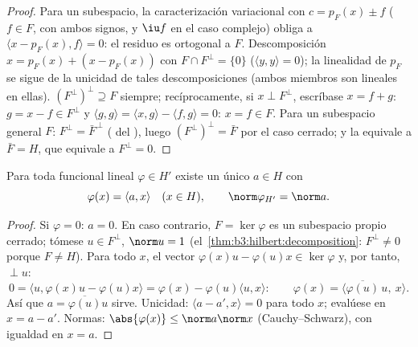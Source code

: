 \begin{proof}
Para un subespacio, la caracterización variacional con $c =
p_F(x) \pm f$ ($f \in F$, con ambos signos, y $\iu f$ en el caso
complejo) obliga a $\langle x - p_F(x), f\rangle = 0$: el residuo es
ortogonal a $F$. Descomposición $x = p_F(x) + (x
- p_F(x))$ con $F \cap F^\perp = \{0\}$ ($\langle y, y
\rangle = 0$); la linealidad de $p_F$ se sigue de la unicidad de tales
descomposiciones (ambos miembros son lineales en ellas). $(F^\perp)
^\perp \supseteq F$ siempre; recíprocamente, si $x \perp F^\perp$,
escríbase $x = f + g$: $g = x - f \in F^\perp$ y $\langle g,
g\rangle = \langle x, g\rangle - \langle f, g\rangle = 0$: $x
= f \in F$. Para un subespacio general $F$: $F^\perp = \bar
F^{\,\perp}$ ( del
), luego
$(F^\perp)^\perp = \bar F$ por el caso cerrado; y la
 equivale a $\bar F = H$, que
equivale a $F^\perp = 0$.
\end{proof}

\begin{theorem}\label{thm:b3:hilbert:riesz}
Para toda funcional lineal 
$\varphi \in H'$ existe un único $a \in H$ con
\[
\varphi(x) = \langle a, x\rangle \quad (x \in H),
\qquad \norm\varphi_{H'} = \norm a .
\]
\end{theorem}

\begin{proof}
Si $\varphi = 0$: $a = 0$. En caso contrario, $F = \ker\varphi$ es un
subespacio propio cerrado; tómese $u \in F^\perp$, $\norm u = 1$
(el~\cref{thm:b3:hilbert:decomposition}: $F^\perp \neq 0$ porque
$F \neq H$). Para todo $x$, el vector $\varphi(x)u -
\varphi(u)x \in \ker\varphi$ y, por tanto, $\perp u$:
\[
0 = \langle u, \varphi(x)u - \varphi(u)x\rangle
= \varphi(x) - \varphi(u)\langle u, x\rangle :
\qquad \varphi(x) = \langle
\overline{\varphi(u)}\,u,\ x\rangle .
\]
Así que $a = \overline{\varphi(u)}u$ sirve. Unicidad: $\langle a
- a', x\rangle = 0$ para todo $x$; evalúese en $x = a - a'$. Normas:
$\abs{\varphi(x)} \leq \norm a\norm x$ (Cauchy--Schwarz), con igualdad
en $x = a$.
\end{proof}

